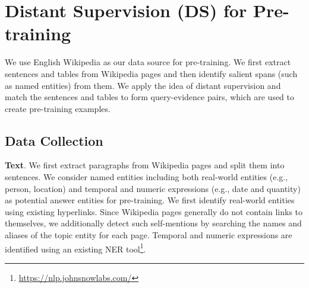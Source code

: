\documentclass[11pt]{article}
\newcommand{\hs}[1]{\textcolor{blue}{Huan: #1}}
\newcommand{\revise}[1]{#1}
\newcommand{\nop}[1]{}
\begin{document}
\nop{I think I understand what the relationship between C and E is, but that seems not clear from the writing.}
\nop{
We first consider a base QA model , that takes as input the question , the selected evidence , and outputs  which are the start, end location of the answer in . Inspired by previous work, we design the base QA model as a sequence encoder, with answer selection headers on top. More specifically, we first concatenate  and add special tokens to form the input sequence as , and get the contextualized input representation  with the encoder. To extract the answer from , we predict the answer span's start and end position  as follows:



Here  are trainable parameters of the the answer selection headers, which extract start and end query vectors using the representation  of special token \texttt{[QUESTION]}. If no answer can be found in the provided evidence, we set  to point to the \texttt{[CLS]} token. \hs{I feel how the encoder representations from Section 4.1 are used in this base QA model or how the pre-trained architecture connects with the base model is not clear yet.}

The loss is then calculated as:


At inference time we score all the start, end locations and rank all spans  by :




In this work, we aim to directly pre-train such a QA model with unlabeled Wikipedia corpus. 
} \section{Distant Supervision (DS) for Pre-training}
\label{sec:DS}
We use English Wikipedia as our data source for pre-training. We first extract sentences and tables from Wikipedia pages and then identify salient spans {(such as named entities) from them}\nop{\hs{from the sentences? because you are saying `used as answers...'} that can be used as answers}. We apply the idea of distant supervision and match the sentences and tables to form query-evidence pairs, {which are used to create pre-training examples.}

\subsection{Data Collection}
\noindent\textbf{Text}. We first extract paragraphs from Wikipedia pages and split them into sentences. We consider named entities including both real-world entities (e.g., person, location) and temporal and numeric expressions (e.g., date and quantity) as potential answer entities for pre-training. We first identify real-world entities using existing hyperlinks. Since Wikipedia pages generally do not contain links to themselves, we additionally detect such self-mentions by searching the names and aliases of the topic entity for each page. \revise{Temporal and numeric expressions are identified using an existing NER tool\footnote{\url{https://nlp.johnsnowlabs.com/}}.}
\end{document}
